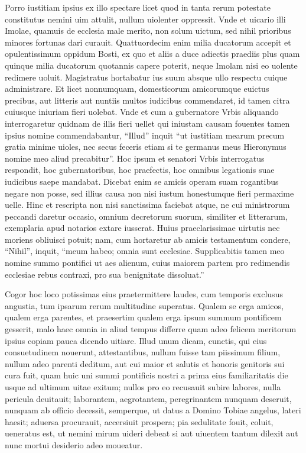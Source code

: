 \documentclass[a5paper,twoside]{article}
\begin{document}
Porro iustitiam ipsius ex illo spectare licet quod in tanta rerum potestate constitutus nemini uim attulit, nullum uiolenter oppressit. Vnde et uicario illi Imolae, quamuis de ecclesia male merito, non solum uictum, sed nihil prioribus minores fortunas dari curauit. Quattuordecim enim milia ducatorum accepit et opulentissimum oppidum Bosti, ex quo et aliis a duce adiectis praediis plus quam quinque milia ducatorum quotannis capere poterit, neque Imolam nisi eo uolente redimere uoluit. Magistratus hortabatur ius suum absque ullo respectu cuique administrare.  Et licet nonnumquam, domesticorum amicorumque euictus precibus, aut litteris aut nuntiis multos iudicibus commendaret, id tamen citra cuiusque iniuriam fieri uolebat. Vnde et cum a gubernatore Vrbis aliquando interrogaretur quidnam de illis fieri uellet qui iniustam causam fouentes tamen ipsius nomine commendabantur, ``Illud'' inquit ``ut iustitiam mearum precum gratia minime uioles, nec secus feceris etiam si te germanus meus Hieronymus nomine meo aliud precabitur''.  Hoc ipsum et senatori Vrbis interrogatus respondit, hoc gubernatoribus, hoc praefectis, hoc omnibus legationis suae iudicibus saepe mandabat.  Dicebat enim se amicis operam suam rogantibus negare non posse, sed illius causa non nisi iustum honestumque fieri permaxime uelle.   Hinc et rescripta non nisi sanctissima faciebat atque, ne cui ministrorum peccandi daretur occasio, omnium decretorum suorum, similiter et litterarum, exemplaria apud notarios extare iusserat.  Huius praeclarissimae uirtutis nec moriens obliuisci potuit; nam, cum hortaretur ab amicis testamentum condere, ``Nihil'', inquit, ``meum habeo; omnia sunt ecclesiae. Supplicabitis tamen meo nomine summo pontifici ut aes alienum, cuius maiorem partem pro redimendis ecclesiae rebus contraxi, pro sua benignitate dissoluat.''

Cogor hoc loco potissimas eius praetermittere laudes, cum temporis exclusus angustia, tum ipsarum rerum multitudine superatus.  Qualem se erga amicos, qualem erga parentes, et praesertim qualem erga ipsum summum pontificem gesserit, malo haec omnia in aliud tempus differre quam adeo felicem meritorum ipsius copiam pauca dicendo uitiare.   Illud unum dicam, cunctis, qui eius consuetudinem nouerunt, attestantibus, nullum fuisse tam piissimum filium, nullum adeo parenti deditum, aut cui maior et salutis et honoris genitoris sui cura fuit, quam huic uni summi pontificis nostri a prima eius familiaritatis die usque ad ultimum uitae exitum; nullos pro eo recusauit subire labores, nulla pericula deuitauit; laborantem, aegrotantem, peregrinantem nunquam deseruit, nunquam ab officio decessit, semperque, ut datus a Domino Tobiae angelus, lateri haesit; aduersa procurauit, accersiuit prospera; pia sedulitate fouit, coluit, ueneratus est, ut nemini mirum uideri debeat si aut uiuentem tantum dilexit aut nunc mortui desiderio adeo moueatur.
\end{document}
